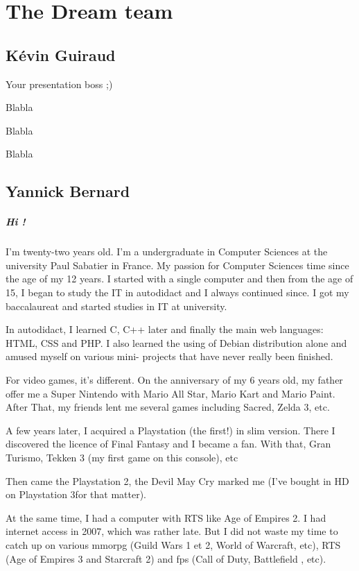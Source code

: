 \documentclass[a4paper,12pt]{book}
\begin{document}
\chapter{The Dream team}
\section*{K\'{e}vin Guiraud}
Your presentation boss ;)

Blabla

Blabla

Blabla
\section*{Yannick Bernard}
\paragraph{Hi !} I'm twenty-two years old. I'm a undergraduate in Computer Sciences at the university Paul Sabatier in France. My passion for Computer Sciences time since the age of my 12 years. I started with a single computer and then from the age of 15, I began to study the IT in autodidact and I always continued since. I got my baccalaureat and started studies in IT at university.

In autodidact, I learned C, C++ later and finally the main web languages: HTML, CSS and PHP. I also learned the using of Debian distribution alone and amused myself on various mini- projects that have never really been finished.

For video games, it's different. On the anniversary of my 6 years old, my father offer me a Super Nintendo with Mario All Star, Mario Kart and Mario Paint. After That, my friends lent me several games including Sacred, Zelda 3, etc.

A few years later, I acquired a Playstation (the first!) in slim version. There I discovered the licence of Final Fantasy and I became a fan. With that, Gran Turismo, Tekken 3 (my first game on this console), etc

Then came the Playstation 2, the Devil May Cry marked me (I've bought in HD on Playstation 3for that matter).

At the same time, I had a computer with RTS like Age of Empires 2. I had internet access in 2007, which was rather late. But I did not waste my time to catch up on various mmorpg (Guild Wars 1 et 2, World of Warcraft, etc), RTS (Age of Empires 3 and Starcraft 2) and fps (Call of Duty, Battlefield , etc).
\end{document}

